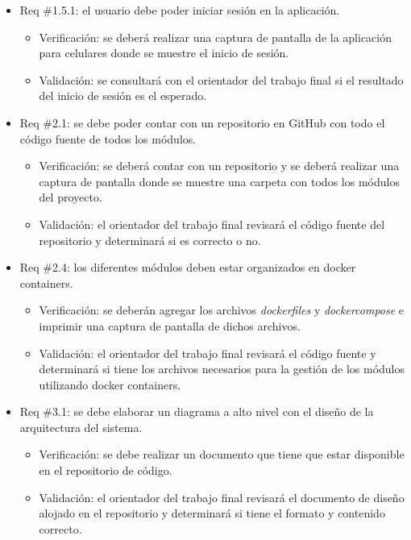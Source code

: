 \documentclass[
11pt, %
]{charter}
\begin{document}
\begin{itemize}
\item Req \#1.5.1: el usuario debe poder iniciar sesión en la aplicación.

\begin{itemize}
	\item Verificación: se deberá realizar una captura de pantalla de la aplicación para celulares donde se muestre el inicio de sesión.
	\item Validación: se consultará con el orientador del trabajo final si el resultado del inicio de sesión es el esperado.
\end{itemize}
\item Req \#2.1: se debe poder contar con un repositorio en GitHub con todo el código fuente de todos los módulos.

\begin{itemize}
	\item Verificación: se deberá contar con un repositorio y se deberá realizar una captura de pantalla donde se muestre una carpeta con todos los módulos del proyecto.
	\item Validación: el orientador del trabajo final revisará el código fuente del repositorio y determinará si es correcto o no.
\end{itemize}

\item Req \#2.4: los diferentes módulos deben estar organizados en docker containers.

\begin{itemize}
	\item Verificación: se deberán agregar los archivos \textit{dockerfiles} y \textit{dockercompose} e imprimir una captura de pantalla de dichos archivos.
	\item Validación: el orientador del trabajo final revisará el código fuente y determinará si tiene los archivos necesarios para la gestión de los módulos utilizando docker containers.
\end{itemize}

\item Req \#3.1: se debe elaborar un diagrama a alto nivel con el diseño de la arquitectura del sistema.

\begin{itemize}
	\item Verificación: se debe realizar un documento que tiene que estar disponible en el repositorio de código.
	\item Validación: el orientador del trabajo final revisará el documento de diseño alojado en el repositorio y determinará si tiene el formato y contenido correcto.
\end{itemize}


\end{itemize}
\end{document}
